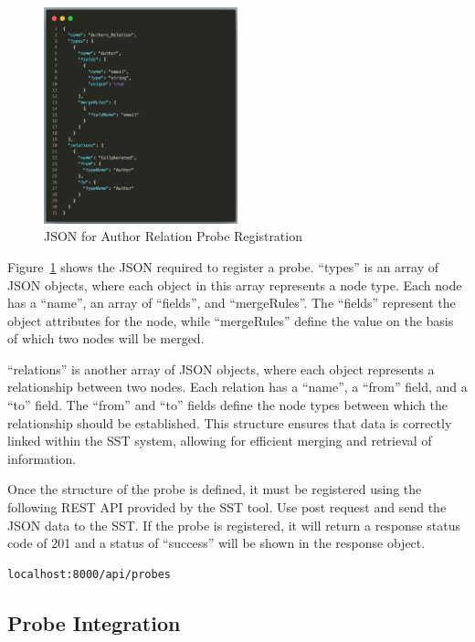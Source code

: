 \begin{figure}[H]
    \centering
    \includegraphics[width=0.50\textwidth]{figures/author_relation.png}
    \caption{JSON for Author Relation Probe Registration}
    \label{fig:json_author_relation}
\end{figure}

Figure~\ref{fig:json_author_relation} shows the JSON required to register a probe. ``types'' is an array of JSON objects, where each object in this array represents a node type. Each node has a ``name'', an array of ``fields'', and ``mergeRules''. The ``fields'' represent the object attributes for the node, while ``mergeRules'' define the value on the basis of which two nodes will be merged.  

``relations'' is another array of JSON objects, where each object represents a relationship between two nodes. Each relation has a ``name'', a ``from'' field, and a ``to'' field. The ``from'' and ``to'' fields define the node types between which the relationship should be established. This structure ensures that data is correctly linked within the SST system, allowing for efficient merging and retrieval of information.

Once the structure of the probe is defined, it must be registered using the following REST API provided by the SST tool. Use post request and send the JSON data to the SST. If the probe is registered, it will return a response status code of 201 and a status of ``success'' will be shown in the response object.
\begin{lstlisting}[language=bash]
localhost:8000/api/probes
\end{lstlisting}

\subsection{Probe Integration}

